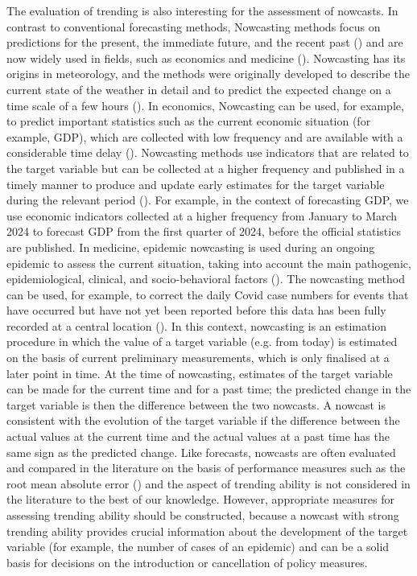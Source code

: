 The evaluation of trending is also interesting for the assessment of nowcasts.
In contrast to conventional forecasting methods, Nowcasting methods focus on predictions for the present, the immediate future, and the recent past (\cite{banbura2013now}) and are now widely used in fields, such as economics and medicine (\cite{bok2018macroeconomic, wolffram2023collaborative}).
Nowcasting has its origins in meteorology, and the methods were originally developed to describe the current state of the weather in detail and to predict the expected change on a time scale of a few hours (\cite{browning1989nowcasting,schmid2019nowcasting}). In economics, Nowcasting can be used, for example, to predict important statistics such as the current economic situation (for example, GDP), which are collected with low frequency and are available with a considerable time delay (\cite{banbura2013now}).
Nowcasting methods use indicators that are related to the target variable but can be collected at a higher frequency and published in a timely manner to produce and update early estimates for the target variable during the relevant period (\cite{castle2017forecasting}). For example, in the context of forecasting GDP, we use economic indicators collected at a higher frequency from January to March 2024 to forecast GDP from the first quarter of 2024, before the official statistics are published.
In medicine, epidemic nowcasting is used during an ongoing epidemic to assess the current situation, taking into account the main pathogenic, epidemiological, clinical, and socio-behavioral factors (\cite{wu2021nowcasting}). 
The nowcasting method can be used, for example, to correct the daily Covid case numbers for events that have occurred but have not yet been reported before this data has been fully recorded at a central location (\cite{gunther2021nowcasting}). 
In this context, nowcasting is an estimation procedure in which the value of a target variable (e.g. from today) is estimated on the basis of current preliminary measurements, which is only finalised at a later point in time. 
At the time of nowcasting, estimates of the target variable can be made for the current time and for a past time; the predicted change in the target variable is then the difference between the two nowcasts. A nowcast is consistent with the evolution of the target variable if the difference between the actual values at the current time and the actual values at a past time has the same sign as the predicted change. Like forecasts, nowcasts are often evaluated and compared in the literature on the basis of performance measures such as the root mean absolute error (\cite{gunther2021nowcasting}) and the aspect of trending ability is not considered in the literature to the best of our knowledge. However, appropriate measures for assessing trending ability should be constructed, because a nowcast with strong trending ability provides crucial information about the development of the target variable (for example, the number of cases of an epidemic) and can be a solid basis for decisions on the introduction or cancellation of policy measures.

